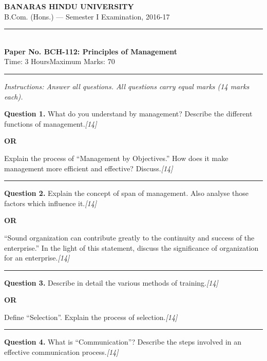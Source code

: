 \documentclass[11pt,a4paper]{article}
\newcommand{\pts}[1]{\hfill   \textit{[#1]}}
\begin{document}
\begin{center}
  {\large\bfseries BANARAS HINDU UNIVERSITY}\\[2pt]
  {\normalsize B.Com. (Hons.) --- Semester I Examination, 2016-17}\\[6pt]
  \rule{0.8\linewidth}{0.5pt}\\[6pt]
  {\large\bfseries Paper No. BCH-112: Principles of Management}\\[4pt]
  {\normalsize Time: 3 Hours\hfill Maximum Marks: 70}
\end{center}

\rule{\linewidth}{0.4pt}

\smallskip



\noindent   \textit{Instructions: Answer all questions. All questions carry equal marks (14 marks each).}

\bigskip




\noindent   \textbf{Question 1.}
What do you understand by management? Describe the different functions of management.\pts{14}

\centerline{   \textbf{OR}}

Explain the process of ``Management by Objectives.'' How does it make management more efficient and effective? Discuss.\pts{14}

\medskip\rule{\linewidth}{0.2pt}




\noindent   \textbf{Question 2.}
Explain the concept of span of management. Also analyse those factors which influence it.\pts{14}

\centerline{   \textbf{OR}}

``Sound organization can contribute greatly to the continuity and success of the enterprise.'' In the light of this statement, discuss the significance of organization for an enterprise.\pts{14}

\medskip\rule{\linewidth}{0.2pt}




\noindent   \textbf{Question 3.}
Describe in detail the various methods of training.\pts{14}

\centerline{   \textbf{OR}}

Define ``Selection''. Explain the process of selection.\pts{14}

\medskip\rule{\linewidth}{0.2pt}




\noindent   \textbf{Question 4.}
What is ``Communication''? Describe the steps involved in an effective communication process.\pts{14}
\end{document}
